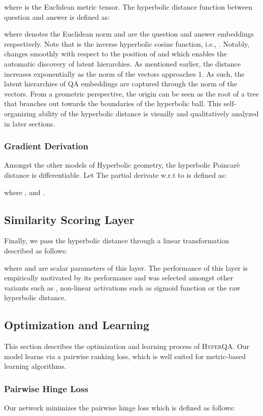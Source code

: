 \documentclass[sigconf]{acmart}
\begin{document}
where  is the Euclidean metric tensor. The hyperbolic distance function between question and answer is defined as:

where  denotes the Euclidean norm and  are the question and answer embeddings respectively. Note that  is the inverse hyperbolic cosine function, i.e., . Notably,  changes smoothly with respect to the position of  and  which enables the automatic discovery of latent hierarchies. As mentioned earlier, the distance increases exponentially as the norm of the vectors approaches 1. As such, the latent hierarchies of QA embeddings are captured through the norm of the vectors. From a geometric perspective, the origin can be seen as the root of a tree that branches out towards the boundaries of the hyperbolic ball. This self-organizing ability of the hyperbolic distance is visually and qualitatively analyzed in later sections. 

\subsubsection{Gradient Derivation}
Amongst the other models of Hyperbolic geometry, the hyperbolic Poincar\`e distance is differentiable. Let  The partial derivate w.r.t to  is defined as:

where ,  and . 

\subsection{Similarity Scoring Layer}
Finally, we pass the hyperbolic distance through a linear transformation described as follows:


where  and  are scalar parameters of this layer. The performance of this layer is empirically motivated by its performance and was selected amongst other variants such as , non-linear activations such as sigmoid function or the raw hyperbolic distance. 


\subsection{Optimization and Learning}
This section describes the optimization and learning process of \textsc{HyperQA}. Our model learns via a pairwise ranking loss, which is well suited for metric-based learning algorithms.  
\subsubsection{Pairwise Hinge Loss}
Our network minimizes the pairwise hinge loss which is defined as follows:
\end{document}
